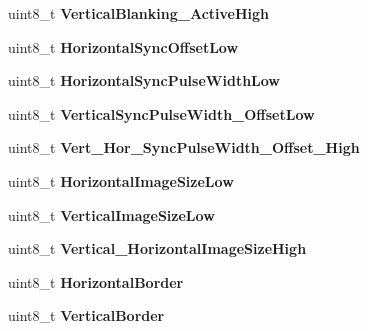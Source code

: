 \begin{DoxyCompactItemize}
\item 
\mbox{\label{structRTEMS__PACKED_a40d443e60bd3e98f8731e613233c6236}} 
uint8\+\_\+t {\bfseries Vertical\+Blanking\+\_\+\+Active\+High}
\item 
\mbox{\label{structRTEMS__PACKED_a3f67b71bfbbbcb6f8fbae76797981b6e}} 
uint8\+\_\+t {\bfseries Horizontal\+Sync\+Offset\+Low}
\item 
\mbox{\label{structRTEMS__PACKED_ae41c99b90a49e8a3253647a9751bcf1d}} 
uint8\+\_\+t {\bfseries Horizontal\+Sync\+Pulse\+Width\+Low}
\item 
\mbox{\label{structRTEMS__PACKED_a25382b45e14da2fbc9f48d4c997348bb}} 
uint8\+\_\+t {\bfseries Vertical\+Sync\+Pulse\+Width\+\_\+\+Offset\+Low}
\item 
\mbox{\label{structRTEMS__PACKED_a8d1acc78398a02d3c94dbe42d560bd0b}} 
uint8\+\_\+t {\bfseries Vert\+\_\+\+Hor\+\_\+\+Sync\+Pulse\+Width\+\_\+\+Offset\+\_\+\+High}
\item 
\mbox{\label{structRTEMS__PACKED_a4da2c6dc6287006e7ff60a7bc0709898}} 
uint8\+\_\+t {\bfseries Horizontal\+Image\+Size\+Low}
\item 
\mbox{\label{structRTEMS__PACKED_a7069971f5e6e8506bc92a58858320cb8}} 
uint8\+\_\+t {\bfseries Vertical\+Image\+Size\+Low}
\item 
\mbox{\label{structRTEMS__PACKED_a24ef9d1976c1e007a1ed1a679c83b76d}} 
uint8\+\_\+t {\bfseries Vertical\+\_\+\+Horizontal\+Image\+Size\+High}
\item 
\mbox{\label{structRTEMS__PACKED_ad64836cb72113012133d9bc08178a44e}} 
uint8\+\_\+t {\bfseries Horizontal\+Border}
\item 
\mbox{\label{structRTEMS__PACKED_a91da93a58c3d1433d1f41dfd4212fe59}} 
uint8\+\_\+t {\bfseries Vertical\+Border}
\item 
\mbox{\label{structRTEMS__PACKED_aef073c14e80c8b7969608432a2d504e6}} 

\end{DoxyCompactItemize}

